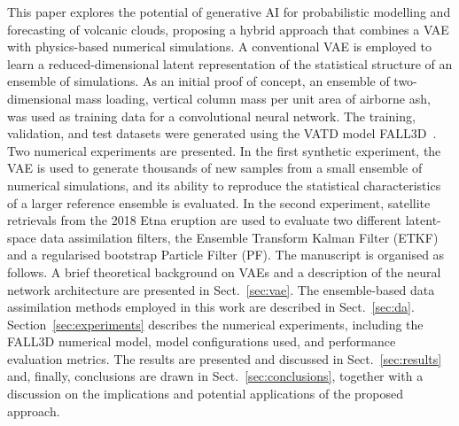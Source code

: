 %
%
This paper explores the potential of generative AI for probabilistic modelling and forecasting of volcanic clouds, proposing a hybrid approach that combines a VAE with physics-based numerical simulations. A conventional VAE is employed to learn a reduced-dimensional latent representation of the statistical structure of an ensemble of simulations. As an initial proof of concept, an ensemble of two-dimensional mass loading, \ie vertical column mass per unit area of airborne ash, was used as training data for a convolutional neural network. The training, validation, and test datasets were generated using the VATD model FALL3D~\citep{folch2020,prata2021,folch2025}.
%
Two numerical experiments are presented. In the first synthetic experiment, the VAE is used to generate thousands of new samples from a small ensemble of numerical simulations, and its ability to reproduce the statistical characteristics of a larger reference ensemble is evaluated. In the second experiment, satellite retrievals from the 2018 Etna eruption are used to evaluate two different latent-space data assimilation filters, the Ensemble Transform Kalman Filter (ETKF) and a regularised bootstrap Particle Filter (PF).
%
%
The manuscript is organised as follows. A brief theoretical background on VAEs and a description of the neural network architecture are presented in Sect.~\ref{sec:vae}. The ensemble-based data assimilation methods employed in this work are described in Sect.~\ref{sec:da}. Section~\ref{sec:experiments} describes the numerical experiments, including the FALL3D numerical model, model configurations used, and performance evaluation metrics. The results are presented and discussed in Sect.~\ref{sec:results} and, finally, conclusions are drawn in Sect.~\ref{sec:conclusions}, together with a discussion on the implications and potential applications of the proposed approach.
